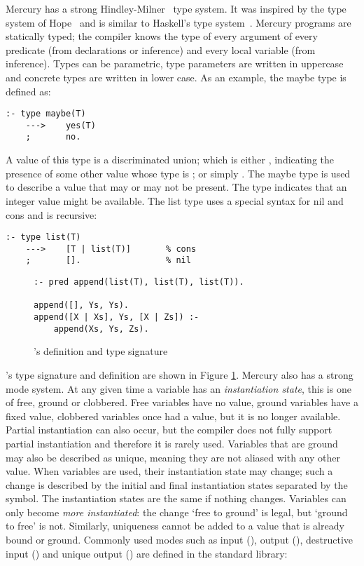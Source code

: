 Mercury has a strong Hindley-Milner~\citep{hindley69:types,milner78:types} type
system.
It was inspired by the type system of Hope~\citep{hope}
and is similar to Haskell's type system~\citep{haskell98}.
Mercury programs are statically typed; the compiler knows the type of every
argument of every predicate (from declarations or inference) and every local
variable (from inference).
Types can be parametric,
type parameters are written in uppercase and
concrete types are written in lower case.
As an example, the maybe type is defined as:

\begin{verbatim}
:- type maybe(T)
    --->    yes(T)
    ;       no.
\end{verbatim}

\noindent
A value of this type is a discriminated union;
which is either , indicating the presence of some other value
whose type is ;
or simply .
The maybe type is used to describe a value that may or may not be present.
The type  indicates that an integer value might be
available.
The list type uses a special syntax for nil and cons and is recursive:

\begin{verbatim}
:- type list(T)
    --->    [T | list(T)]       % cons
    ;       [].                 % nil
\end{verbatim}

\begin{figure}
\begin{verbatim}
:- pred append(list(T), list(T), list(T)).

append([], Ys, Ys).
append([X | Xs], Ys, [X | Zs]) :-
    append(Xs, Ys, Zs).
\end{verbatim}
\caption{'s definition and type signature}
\label{fig:append_type_and_defn}
\end{figure}

\noindent
{}'s type signature and definition are shown in Figure
\ref{fig:append_type_and_defn}.
Mercury also has a strong mode system.
At any given time a variable has an \emph{instantiation state},
this is one of free, ground or clobbered.
Free variables have no value,
ground variables have a fixed value,
clobbered variables once had a value, but it is no longer available.
Partial instantiation can also occur,
but the compiler does not fully support partial instantiation
and therefore it is rarely used.
Variables that are ground may also be described as unique,
meaning they are not aliased with any other value.
When variables are used, their instantiation state may change;
such a change is described by the initial and final instantiation states
separated by the \code{>>} symbol.
The instantiation states are the same if nothing changes.
Variables can only become \emph{more instantiated}:
the change `free to ground' is legal, but `ground to free' is not.
Similarly, uniqueness cannot be added to a value that is already
bound or ground.
Commonly used modes such as input (), output (),
destructive input () and unique output () are
defined in the standard library:

